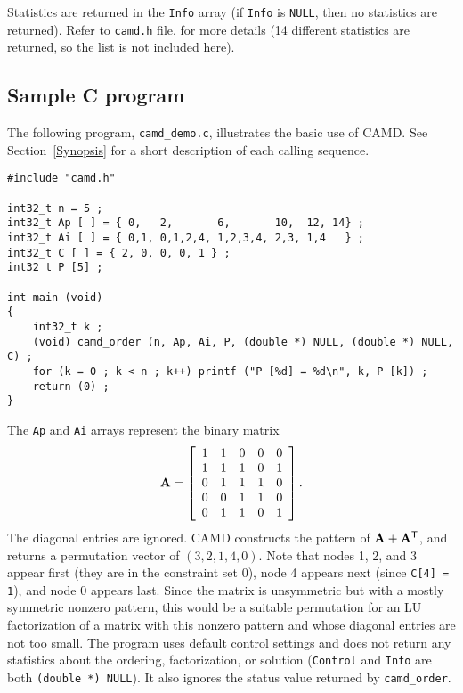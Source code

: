 \documentclass[11pt]{article}
\newcommand{\m}[1]{{\bf{#1}}}       %
\newcommand{\tr}{^{\sf T}}          %
\begin{document}
Statistics are returned in the {\tt Info} array
(if {\tt Info} is {\tt NULL}, then no statistics are returned).
Refer to {\tt camd.h} file, for more details
(14 different statistics are returned, so the list is not included here).

\subsection{Sample C program}

The following program, {\tt camd\_demo.c}, illustrates the basic use of CAMD.
See Section~\ref{Synopsis} for a short description
of each calling sequence.

{\footnotesize
\begin{verbatim}
#include "camd.h"

int32_t n = 5 ;
int32_t Ap [ ] = { 0,   2,       6,       10,  12, 14} ;
int32_t Ai [ ] = { 0,1, 0,1,2,4, 1,2,3,4, 2,3, 1,4   } ;
int32_t C [ ] = { 2, 0, 0, 0, 1 } ;
int32_t P [5] ;

int main (void)
{
    int32_t k ;
    (void) camd_order (n, Ap, Ai, P, (double *) NULL, (double *) NULL, C) ;
    for (k = 0 ; k < n ; k++) printf ("P [%d] = %d\n", k, P [k]) ;
    return (0) ;
}

\end{verbatim}
}

The {\tt Ap} and {\tt Ai} arrays represent the binary matrix
\[
\m{A} = \left[
\begin{array}{rrrrr}
 1 &  1 &  0 &  0 &  0 \\
 1 &  1 &  1 &  0 &  1 \\
 0 &  1 &  1 &  1 &  0 \\
 0 &  0 &  1 &  1 &  0 \\
 0 &  1 &  1 &  0 &  1 \\
\end{array}
\right].
\]
The diagonal entries are ignored.
%
CAMD constructs the pattern of $\m{A}+\m{A}\tr$,
and returns a permutation vector of $(3, 2, 1, 4, 0)$.
Note that nodes 1, 2, and 3 appear first (they are in the constraint set 0),
node 4 appears next (since {\tt C[4] = 1}), and node 0 appears last.
%
Since the matrix is unsymmetric but with a mostly symmetric nonzero
pattern, this would be a suitable permutation for an LU factorization of a
matrix with this nonzero pattern and whose diagonal entries are not too small.
The program uses default control settings and does not return any statistics
about the ordering, factorization, or solution ({\tt Control} and {\tt Info}
are both {\tt (double *) NULL}).  It also ignores the status value returned by
{\tt camd\_order}.
\end{document}
